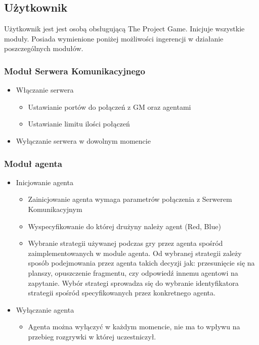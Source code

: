 \documentclass[../Dokumentacja.tex]{subfiles}
\begin{document}
\subsection{Użytkownik}
Użytkownik jest jest osobą obsługującą The Project Game.
Inicjuje wszystkie moduły. Posiada wymienione poniżej możliwości ingerencji
w działanie poszczególnych modułów.
\subsubsection{Moduł Serwera Komunikacyjnego}

\begin{itemize}
    \item Włączanie serwera
    \begin{itemize}
    	\item Ustawianie portów do połączeń z GM oraz agentami
    	\item Ustawianie limitu ilości połączeń
    \end{itemize}
    \item Wyłączanie serwera w dowolnym momencie
\end{itemize}

\subsubsection{Moduł agenta}
\begin{itemize}
	\item Inicjowanie agenta
	\begin{itemize}
		\item Zainicjowanie agenta wymaga parametrów połączenia z Serwerem Komunikacyjnym
		\item Wyspecyfikowanie do której drużyny należy agent (Red, Blue)
		\item Wybranie strategii używanej podczas gry przez agenta spośród zaimplementowanych w module agenta. Od wybranej strategii zależy sposób podejmowania przez agenta takich decyzji jak: przesunięcie się na planszy, opuszczenie fragmentu, czy odpowiedź innemu agentowi na zapytanie. Wybór strategi sprowadza się do wybranie identyfikatora strategii spośród specyfikowanych przez konkretnego agenta.
	\end{itemize}
	\item Wyłączanie agenta
	\begin{itemize}
		\item Agenta można wyłączyć w każdym momencie, nie ma to wpływu na przebieg rozgrywki w której uczestniczył.
	\end{itemize}
\end{itemize}
\end{document}
